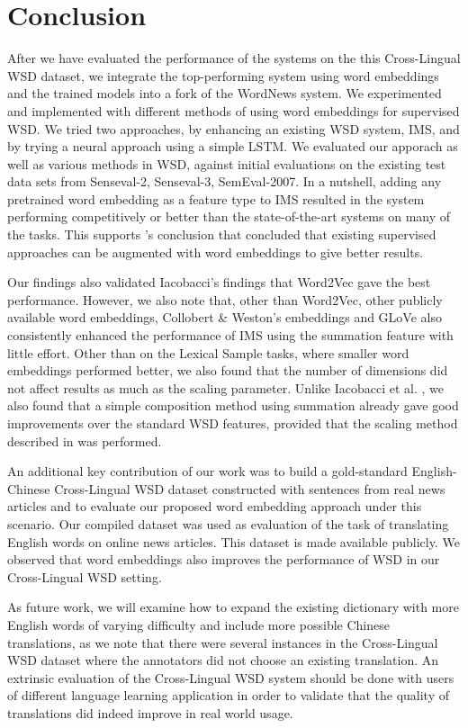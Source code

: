\section{Conclusion}
\label{section:conclusion}

After we have evaluated the performance of the systems on the this
Cross-Lingual WSD dataset, we integrate the top-performing system
using word embeddings and the trained models into a fork of the
WordNews system. We experimented and implemented with different
methods of using word embeddings for supervised WSD. We tried two
approaches, by enhancing an existing WSD system, IMS, and by trying a
neural approach using a simple LSTM.  We evaluated our apporach as
well as various methods in WSD, against initial evaluations on the
existing test data sets from Senseval-2, Senseval-3, SemEval-2007. In
a nutshell, adding any pretrained word embedding as a feature type to
IMS resulted in the system performing competitively or better than the
state-of-the-art systems on many of the tasks. This supports
\cite{Iacobacci2016}'s conclusion that concluded that existing
supervised approaches can be augmented with word embeddings to give
better results.

Our findings also validated Iacobacci's
findings that Word2Vec gave the best performance. However, we also
note that, other than Word2Vec, other publicly available word
embeddings, Collobert \& Weston's embeddings and GLoVe also
consistently enhanced the performance of IMS using the summation
feature with little effort. Other than on the Lexical Sample tasks,
where smaller word embeddings performed better, we also found that the
number of dimensions did not affect results as much as the scaling
parameter. Unlike Iacobacci et al. , we also
found that a simple composition method using summation already gave
good improvements over the standard WSD features, provided that the
scaling method described in \cite{Taghipour15} was performed.

An additional key contribution of our work was to build a
gold-standard English-Chinese Cross-Lingual WSD dataset constructed
with sentences from real news articles and to evaluate our proposed
word embedding approach under this scenario.  Our compiled dataset was
used as evaluation of the task of translating English words on online
news articles. This dataset is made available publicly.  We observed
that word embeddings also improves the performance of WSD in our
Cross-Lingual WSD setting.

As future work, we will examine how to expand the existing dictionary
with more English words of varying difficulty and include more
possible Chinese translations, as we note that there were several
instances in the Cross-Lingual WSD dataset where the annotators did
not choose an existing translation. An extrinsic evaluation of the
Cross-Lingual WSD system should be done with users of different
language learning application in order to validate that the quality of
translations did indeed improve in real world usage.
